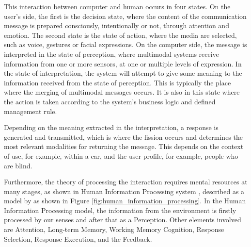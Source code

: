 This interaction between computer and human occurs in four states. On the user's side, the first is the decision state, where the content of the communication message is prepared consciously, intentionally or not, through attention and emotion. The second state is the state of action, where the media are selected, such as voice, gestures or facial expressions. On the computer side, the message is interpreted in the state of perception, where multimodal systems receive information from one or more sensors, at one or multiple levels of expression. In the state of interpretation, the system will attempt to give some meaning to the information received from the state of perception. This is typically the place where the merging of multimodal messages occurs. It is also in this state where the action is taken according to the system's business logic and defined management rule.
        
Depending on the meaning extracted in the interpretation, a response is generated and transmitted, which is where the fission occurs and determines the most relevant modalities for returning the message. This depends on the context of use, for example, within a car, and the user profile, for example, people who are blind.

Furthermore, the theory of processing the interaction requires mental resources at many stages, as shown in Human Information Processing system \cite{Lindsay1977}, described as a model by \cite{wickens2015engineering} as shown in Figure \ref{fig:human_information_processing}. In the Human Information Processing model, the information from the environment is firstly processed by our senses and after that as a Perception. Other elements involved are Attention, Long-term Memory, Working Memory Cognition, Response Selection, Response Execution, and the Feedback.

 	\begin{figure}[h] 
   	    \captionsetup{width=16cm}%
	\end{figure}

